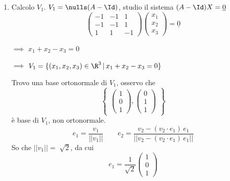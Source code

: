 {\begin{enumerate}
    Sapendo quindi che $ \R^{3}=V_{-2}\oplus V_{1}$
    \item Calcolo $ V_1 $. $ V_1 =\nulls (A-\Id)$, studio il sistema $ (A-\Id)X=\underline{0} $ \[
        \begin{pmatrix}
            -1 & -1 & 1 \\
            -1 & -1 & 1 \\
            1 & 1 & -1
        \end{pmatrix} \begin{pmatrix}
            x_1 \\ x_2\\ x_3
        \end{pmatrix}=\underline{0}
    \]

    $ \implies  $ $ x_1+x_2-x_3=0 $ 

    $ \implies $ $ V_1=\{(x_1, x_2, x_3) \in \R^{3}\,|\, x_1+x_2-x_3=0\} $

    Trovo una base ortonormale di $ V_1 $, osservo che \[
        \begin{Bmatrix}
            \begin{pmatrix}
            1 \\0 \\ 1
            \end{pmatrix}, \begin{pmatrix}
                0 \\ 1 \\ 1
            \end{pmatrix}
        \end{Bmatrix}
    \] è base di $ V_1 $, non ortonormale. \[
        e_1=\frac{v_1}{||v_1||}\qquad e_2=\frac{v_2-(v_2 \cdot e_1)\,e_1}{||v_2-(v_2 \cdot e_1)\,e_1||}
    \] So che $ ||v_1||=\sqrt[]{2} $, da cui \[
        e_1=\frac{1}{\sqrt{2}}\begin{pmatrix}
            1\\0\\1
        \end{pmatrix}
    \]


\end{enumerate}}
